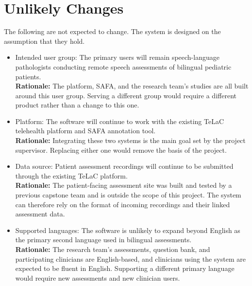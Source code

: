 \documentclass[12pt]{article}
\newcounter{lcnum} %
\newcounter{ulcnum} %
\begin{document}
\section{Unlikely Changes}
The following are not expected to change. The system is designed on the
assumption that they hold.
\noindent
\begin{itemize}

\item[\textbf{ULC\refstepcounter{ulcnum}\theulcnum}\label{ULC_IntendedUserGroup}:] Intended user group: The primary users will remain speech-language pathologists conducting remote speech assessments of bilingual pediatric patients.
  \\ \textbf{Rationale:} The \progname{} platform, SAFA, and the research team's studies are all built around this user group. Serving a different group would require a different product rather than a change to this one.

\item[\textbf{ULC\refstepcounter{ulcnum}\theulcnum}\label{ULC_Platform}:] Platform: The software will continue to work with the existing TeLaC telehealth platform and SAFA annotation tool.
  \\ \textbf{Rationale:} Integrating these two systems is the main goal set by the project supervisor. Replacing either one would remove the basis of the project.

\item[\textbf{ULC\refstepcounter{ulcnum}\theulcnum}\label{ULC_DataSource}:] Data source: Patient assessment recordings will continue to be submitted through the existing TeLaC platform.
  \\ \textbf{Rationale:} The patient-facing assessment site was built and tested by a previous capstone team and is outside the scope of this project. The system can therefore rely on the format of incoming recordings and their linked assessment data.

\item[\textbf{ULC\refstepcounter{ulcnum}\theulcnum}\label{ULC_SupportedLanguages}:] Supported languages: The software is unlikely to expand beyond English as the primary second language used in bilingual assessments.
  \\ \textbf{Rationale:} The research team's assessments, question bank, and participating clinicians are English-based, and clinicians using the system are expected to be fluent in English. Supporting a different primary language would require new assessments and new clinician users.

\end{itemize}
\newpage{}
\end{document}

